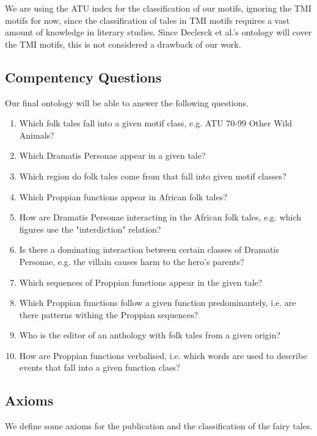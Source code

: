 \documentclass[10pt,a4paper]{article}
\begin{document}
We are using the ATU index for the classification of our motifs, ignoring the TMI motifs for now, since the classification of tales in TMI motifs requires a vast amount of  knowledge in literary studies. Since Declerck et al.'s ontology will cover the TMI motifs, this is not considered a drawback of our work. 

	 \subsection{Compentency Questions}
	 Our final ontology will be able to answer the following questions. 
	 
	 	\begin{enumerate}
	 		\item Which folk tales fall into a given motif class, e.g. ATU 70-99 Other Wild Animals? 
	 		\item Which Dramatis Personae appear in a given tale? 
	 		\item Which region do folk tales come from that fall into given motif classes? 
	 		\item Which Proppian functions appear in African folk tales? 
	 		\item How are Dramatis Personae interacting in the African folk tales, e.g. which figures use the "interdiction" relation?
	 		\item Is there a dominating interaction between certain classes of Dramatis Personae, e.g. the villain causes harm to the hero's parents?
	 		\item Which sequences of Proppian functions appear in the given tale?
	 		\item Which Proppian functions follow a given function predominantely, i.e. are there patterns withing the Proppian sequences? 
	 		\item Who is the editor of an anthology with folk tales from a given origin?
	 		\item How are Proppian functions verbalised, i.e. which words are used to describe events that fall into a given function class? 
	 	\end{enumerate}


	\subsection{Axioms}
	\label{axes}
We define some axioms for the publication and the classification of the fairy tales. 
	\small 
\end{document}
